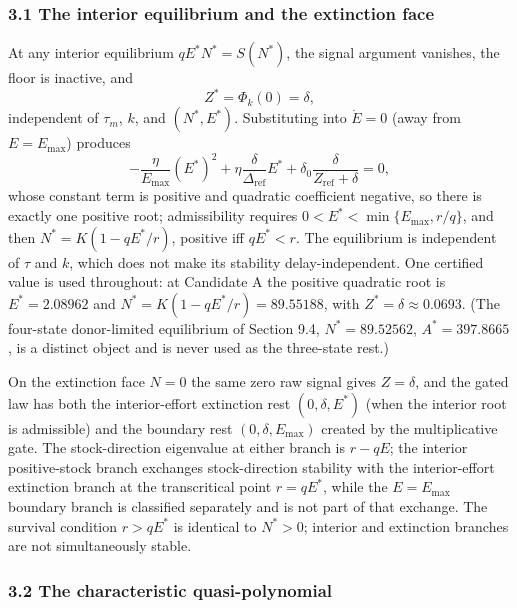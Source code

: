 \documentclass[11pt]{article}
\begin{document}
\subsubsection{3.1 The interior equilibrium and the extinction
face}\label{the-interior-equilibrium-and-the-extinction-face}

At any interior equilibrium \(qE^*N^* = S(N^*)\), the signal argument
vanishes, the floor is inactive, and \[Z^* = \Phi_k(0) = \delta,\]
independent of \(\tau_m\), \(k\), and \((N^*, E^*)\). Substituting into
\(\dot E = 0\) (away from \(E = E_{\max}\)) produces
\[-\frac{\eta}{E_{\max}}(E^*)^2 + \eta\frac{\delta}{\Delta_{\mathrm{ref}}}E^* + \delta_0\frac{\delta}{Z_{\mathrm{ref}} + \delta} = 0,\]
whose constant term is positive and quadratic coefficient negative, so
there is exactly one positive root; admissibility requires
\(0 < E^* < \min\{E_{\max}, r/q\}\), and then \(N^* = K(1 - qE^*/r)\),
positive iff \(qE^* < r\). The equilibrium is independent of \(\tau\)
and \(k\), which does not make its stability delay-independent. One
certified value is used throughout: at Candidate A the positive
quadratic root is \(E^* = 2.08962\) and
\(N^* = K(1 - qE^*/r) = 89.55188\), with
\(Z^* = \delta \approx 0.0693\). (The four-state donor-limited
equilibrium of Section 9.4, \(N^* = 89.52562\), \(A^* = 397.8665\), is a
distinct object and is never used as the three-state rest.)

On the extinction face \(N = 0\) the same zero raw signal gives
\(Z = \delta\), and the gated law has both the interior-effort
extinction rest \((0, \delta, E^*)\) (when the interior root is
admissible) and the boundary rest \((0, \delta, E_{\max})\) created by
the multiplicative gate. The stock-direction eigenvalue at either branch
is \(r - qE\); the interior positive-stock branch exchanges
stock-direction stability with the interior-effort extinction branch at
the transcritical point \(r = qE^*\), while the \(E = E_{\max}\)
boundary branch is classified separately and is not part of that
exchange. The survival condition \(r > qE^*\) is identical to
\(N^* > 0\); interior and extinction branches are not simultaneously
stable.

\subsubsection{3.2 The characteristic
quasi-polynomial}\label{the-characteristic-quasi-polynomial}
\end{document}
